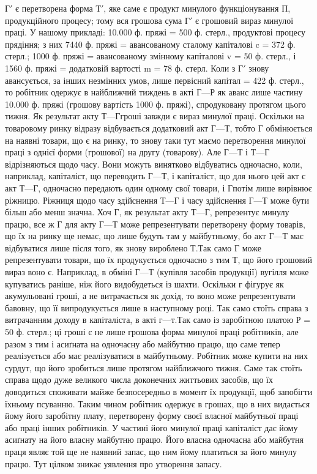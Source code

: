 $Г'$ є перетворена форма $Т'$, яке саме є продукт минулого функціонування
П, продукційного процесу; тому вся грошова сума $Г'$ є грошовий
вираз минулої праці. У нашому прикладі: 10.000 ф. пряжі = 500 ф. стерл.,
продуктові процесу прядіння; з них 7440 ф. пряжі = авансованому
сталому капіталові c = 372 ф. стерл.; 1000 ф. пряжі = авансованому
змінному капіталові v = 50 ф. стерл., і 1560 ф. пряжі = додатковій
вартості m = 78 ф. стерл. Коли з $Г'$ знову авансується, за інших незмінних
умов, лише первісний капітал = 422 ф. стерл., то робітник одержує
в найближчий тиждень в акті $Г — Р$ як аванс лише частину 10.000 ф.
пряжі (грошову вартість 1000 ф. пряжі), спродуковану протягом цього
тижня. Як результат акту $Т — Г г$роші завжди є вираз минулої праці.
Оскільки на товаровому ринку відразу відбувається додатковий акт $Г — Т$,
тобто Г обмінюється на наявні товари, що є на ринку, то знову таки
тут маємо перетворення минулої праці з однієї форми (грошової) на
другу (товарову). Але $Г — Т$ і $Т — Г$ відрізняються щодо часу. Вони
можуть винятково відбуватись одночасно, коли, наприклад, капіталіст,
що переводить $Г — Т$, і капіталіст, що для нього цей акт є акт
$Т — Г$, одночасно передають один одному свої товари, і $Г п$отім лише
вирівнює ріжницю. Ріжниця щодо часу здійснення $Т — Г$ і часу здійснення
$Г — Т$ може бути більш або менш значна. Хоч Г, як результат акту
$Т — Г$, репрезентує минулу працю, все ж Г для акту $Г — Т$ може
репрезентувати перетворену форму товарів, що їх на ринку ще немає,
що лише будуть там у майбутньому, бо акт $Г — Т$ має відбуватися
лише після того, як знову вироблено $Т. Т$ак само Г може
репрезентувати товари, що їх продукується одночасно з тим Т, що його
грошовий вираз воно є. Наприклад, в обміні $Г — Т$ (купівля засобів
продукції) вугілля може купуватись раніше, ніж його видобудеться із
шахти. Оскільки г фігурує як акумульовані гроші, а не витрачається
як дохід, то воно може репрезентувати бавовну, що її випродукується
лише в наступному році. Так само стоїть справа з витрачанням доходу
в капіталіста, в акті $г — т. Т$ак само із заробітною платою Р = 50 ф.
стерл.; ці гроші є не лише грошова форма минулої праці робітників, але
разом з тим і асиґната на одночасну або майбутню працю, що
саме тепер реалізується або має реалізуватися в майбутньому. Робітник
може купити на них сурдут, що його зробиться лише протягом найближчого
тижня. Саме так стоїть справа щодо дуже великого числа доконечних
життьових засобів, що їх доводиться споживати майже безпосередньо в
момент їх продукції, щоб запобігти їхньому псуванню. Таким чином
робітник одержує в грошах, що в них видається йому його заробітну плату,
перетворену форму своєї власної майбутньої праці або праці інших робітників.
У частині його минулої праці капіталіст дає йому асиґнату на його
власну майбутню працю. Його власна одночасна або майбутня праця
являє той ще не наявний запас, що ним йому платиться за його минулу
працю. Тут цілком зникає уявлення про утворення запасу.

